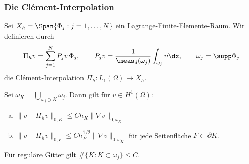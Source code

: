 \subsubsection{Die Cl\'ement-Interpolation}

\begin{Satz}
    \label{satz:4.16}
    Sei $X_h = \Span\{\Phi_j: j=1,\dots,N\}$ ein Lagrange-Finite-Elemente-Raum.
    Wir definieren durch
    \begin{eqnarray*}
        \Pi_h v = \sum_{j=1}^N P_jv\, \Phi_j,
        \qquad
        P_jv = \frac{1}{\meas_d(\omega_j)} \int_{\omega_j} v \dx,
        \qquad
        \omega_j = \supp \Phi_j
    \end{eqnarray*}
    die Cl\'ement-Interpolation $\Pi_h\colon L_1(\Omega) \longrightarrow X_h$.
    
    Sei $\omega_K = \bigcup_{\omega_j\supset K} \omega_j$.
    Dann gilt für $v\in H^1(\Omega)$:
    \begin{enumerate}[a)]
      \item
        $\|v - \Pi_h v\|_{0,K} \le C h_K \|\nabla v\|_{0,\omega_K}$
      \item
        $\|v -\Pi_h v\|_{0,F} \le C h_F^{1/2} 
        \|\nabla v\|_{0,\omega_K}$ für jede Seitenfläche $F \subset \partial K$.
\end{enumerate}
\end{Satz}


\begin{Bemerkung}
    Für reguläre Gitter gilt
    $\#\{K: K \subset \omega_j\} \le C$.
\end{Bemerkung}
      

